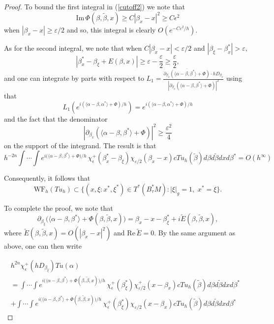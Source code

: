 \documentclass[11pt,reqno]{amsart}
\newcommand{\ep}{\varepsilon}
\renewcommand{\Im} {\mathrm{Im\,}}
\renewcommand{\Re} {\mathrm{Re\,}}
\theoremstyle{definition}
\begin{document}
\begin{proof}
To bound the first integral in (\ref{cutoff2}) we note that 
$$ \Im \Phi(\beta,\tilde{\beta},x) \geq C |\beta_x-x|^2 \geq C \epsilon^2$$
when $|\beta_x -x| \geq \ep/2$ and so, this integral is clearly $O(e^{-C \ep^2/h}).$ 

As for the second integral, we note that when $C |\beta_x -x| < \ep/2$ and $|\beta_{\xi} - \beta_x^*| > \ep,$
$$ |  \beta_x^* - \beta_{\xi} + E(\beta,x) | \geq \ep - \frac{\ep}{2} \geq \frac{\ep}{2},$$
and one can integrate by parts with respect to $ L_1 =  \frac{ \overline{\partial_{\beta_x} ( \langle \alpha - \beta, \beta^* \rangle  + \Phi)} \cdot h D_{\beta_x}}{  | \partial_{\beta_x} ( \langle \alpha - \beta, \beta^* \rangle  + \Phi)  |^2}$ using that 
$$ L_1 ( e^{i ( \langle \alpha - \beta, \alpha^* \rangle  + \Phi )/h} ) = e^{i ( \langle \alpha - \beta, \alpha^* \rangle  + \Phi )/h}$$
and the fact that the denominator 
$$ | \partial_{\beta_x} ( \langle \alpha - \beta, \beta^* \rangle  + \Phi)  |^2 \geq \frac{\ep^2}{4}$$
on the support of the integrand. The result is that
$$
h^{-2n} \int \cdots \int e^{i  \big( \langle \alpha - \beta, \beta^* \rangle  + \Phi  \big)/h } \, \chi_{\epsilon}^+ (\beta_x^*- \beta_{\xi})  \chi_{\ep/2}(\beta_x -x) c Tu_h(\tilde{\beta})d\beta d\tilde{\beta} dx d\beta^* = O(h^{\infty})
$$

Consequently, it follows that
\begin{equation}\label{wf3}
 \text{WF}_h(Tu_h)\subset \big\{(x,\xi :x^*,\xi^*)\in T^*(B_{\tau}^*M): |\xi|_g=1, \, \, x^* = \xi \big\}.
\end{equation}

To complete the proof, we note that
$$
\partial_{\beta_{\xi}} \big( \langle \alpha - \beta, \beta^* \rangle + \Phi(\beta,\tilde{\beta},x) \big)  = \beta_x - x  - \beta_{\xi}^*  + i \tilde{E}(\beta,\tilde{\beta},x),
$$
where $\tilde{E}(\beta,\tilde{\beta},x) = O(|\beta_x -x|^2)$ and $\Re \tilde{E} = 0.$ By the same argument as above, one can then write

\begin{align} \label{wf4}
h^{2n} \chi_{\epsilon}^+( hD_{\beta_{\xi}} ) Tu(\alpha) \hspace{4in} \nonumber \\
= \int \cdots \int e^{i  \big( \langle \alpha - \beta, \beta^* \rangle  + \Phi(\beta,\tilde{\beta},x)  \big)/h } \, \chi_{\epsilon}^+ (\beta_{\xi}^*)  \chi_{\ep/2}^+ (x-\beta_x ) c Tu_h(\tilde{\beta})d\beta d\tilde{\beta} dx d\beta^* \nonumber \\
+ \int \cdots \int e^{i  \big( \langle \alpha - \beta, \beta^* \rangle  + \Phi(\beta,\tilde{\beta},x)  \big)/h } \, \chi_{\epsilon}^+ (\beta_{\xi}^*)  \chi_{\ep/2}(x-\beta_x ) cTu_h(\tilde{\beta})d\beta d\tilde{\beta} dx d\beta^*
\end{align}



\end{proof}
\end{document}
